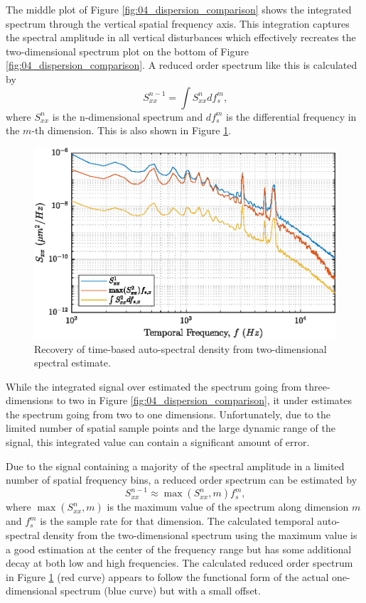 The middle plot of Figure \ref{fig:04_dispersion_comparison} shows the integrated spectrum through the vertical spatial frequency axis.
This integration captures the spectral amplitude in all vertical disturbances which effectively recreates the two-dimensional spectrum plot on the bottom of Figure \ref{fig:04_dispersion_comparison}.
A reduced order spectrum like this is calculated by
\begin{equation}
  S_{xx}^{n-1} = \int S_{xx}^n df_s^m \textrm{,}
\end{equation}
where $S_{xx}^n$ is the n-dimensional spectrum and $df_s^m$ is the differential frequency in the $m$-th dimension.
This is also shown in Figure \ref{fig:04_dispersion_max}.
\begin{figure}
  \centering
  \includegraphics{../matlab/04_dispersion_analysis/dispersion_max.eps}
  \caption{Recovery of time-based auto-spectral density from two-dimensional spectral estimate.}
  \label{fig:04_dispersion_max}
\end{figure}
While the integrated signal over estimated the spectrum going from three-dimensions to two in Figure \ref{fig:04_dispersion_comparison}, it under estimates the spectrum going from two to one dimensions.
Unfortunately, due to the limited number of spatial sample points and the large dynamic range of the signal, this integrated value can contain a significant amount of error.

Due to the signal containing a majority of the spectral amplitude in a limited number of spatial frequency bins, a reduced order spectrum can be estimated by
\begin{equation}
  S_{xx}^{n-1} \approx \max(S_{xx}^n,m)f_s^m \textrm{,}
\end{equation}
where $\max(S_{xx}^n,m)$ is the maximum value of the spectrum along dimension $m$ and $f_s^m$ is the sample rate for that dimension.
The calculated temporal auto-spectral density from the two-dimensional spectrum using the maximum value is a good estimation at the center of the frequency range but has some additional decay at both low and high frequencies.
The calculated reduced order spectrum in Figure \ref{fig:04_dispersion_max} (red curve) appears to follow the functional form of the actual one-dimensional spectrum (blue curve) but with a small offset.

